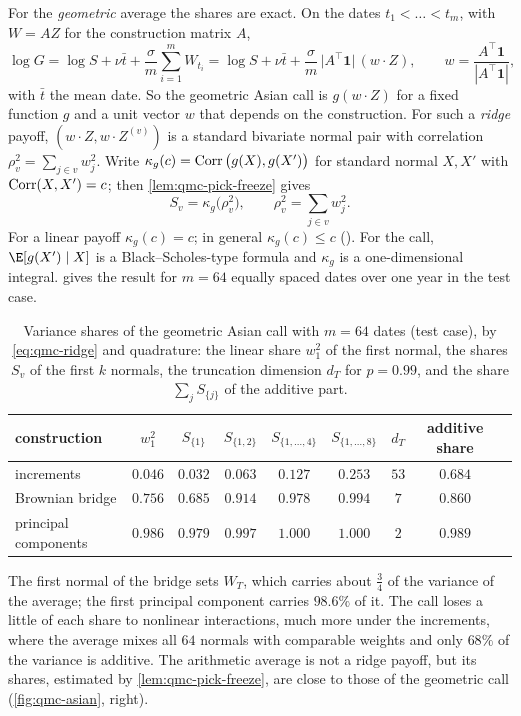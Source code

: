 For the \emph{geometric} average the shares are exact. On the dates $t_1<\dots<t_m$, with
$W=AZ$ for the construction matrix $A$,
\[
  \log G=\log S+\nu\bar t+\frac\sigma m\sum_{i=1}^mW_{t_i}
  =\log S+\nu\bar t+\frac\sigma m\,\big|A^\top\mathbf 1\big|\,(w\cdot Z),\qquad
  w=\frac{A^\top\mathbf 1}{|A^\top\mathbf 1|},
\]
with $\bar t$ the mean date. So the geometric Asian call is $g(w\cdot Z)$ for a fixed
function $g$ and a unit vector $w$ that depends on the construction. For such a \emph{ridge}
payoff, $(w\cdot Z,w\cdot Z^{(v)})$ is a standard bivariate normal pair with correlation
$\rho_v^2=\sum_{j\in v}w_j^2$. Write $\kappa_g(c)=\operatorname{Corr}\big(g(X),g(X')\big)$ for standard normal
$X,X'$ with $\operatorname{Corr}(X,X')=c$; then \cref{lem:qmc-pick-freeze} gives
\begin{equation}\label{eq:qmc-ridge}
  S_v=\kappa_g\big(\rho_v^2\big),\qquad \rho_v^2=\sum_{j\in v}w_j^2 .
\end{equation}
For a linear payoff $\kappa_g(c)=c$; in general $\kappa_g(c)\le c$ (). For
the call, $\E[g(X')\mid X]$ is a Black--Scholes-type formula and $\kappa_g$ is a one-dimensional
integral.  gives the result for $m=64$ equally spaced dates over one year
in the test case.

\begin{table}[ht]
  \centering
  \small
  \begin{tabular}{@{}lcccccccc@{}}
    \toprule
    construction & $w_1^2$ & $S_{\{1\}}$ & $S_{\{1,2\}}$ & $S_{\{1,\dots,4\}}$ & $S_{\{1,\dots,8\}}$
      & $d_T$ & additive share \\
    \midrule
    increments & $0.046$ & $0.032$ & $0.063$ & $0.127$ & $0.253$ & $53$ & $0.684$\\
    Brownian bridge & $0.756$ & $0.685$ & $0.914$ & $0.978$ & $0.994$ & $7$ & $0.860$\\
    principal components & $0.986$ & $0.979$ & $0.997$ & $1.000$ & $1.000$ & $2$ & $0.989$\\
    \bottomrule
  \end{tabular}
  \caption{Variance shares of the geometric Asian call with $m=64$ dates (test case), by
    \eqref{eq:qmc-ridge} and quadrature: the linear share $w_1^2$ of the first normal, the
    shares $S_v$ of the first $k$ normals, the truncation dimension $d_T$ for $p=0.99$, and the
    share $\sum_jS_{\{j\}}$ of the additive part.}
  \label{tab:qmc-shares}
\end{table}

The first normal of the bridge sets $W_T$, which carries about $\frac34$ of the variance of
the average; the first principal component carries $98.6\%$ of it. The call loses a little
of each share to nonlinear interactions, much more under the increments, where the average
mixes all $64$ normals with comparable weights and only $68\%$ of the variance is additive.
The arithmetic average is not a ridge payoff, but its shares, estimated by
\cref{lem:qmc-pick-freeze}, are close to those of the geometric call (\cref{fig:qmc-asian},
right).

